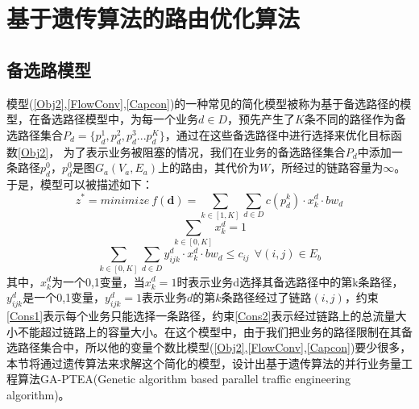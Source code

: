 \section{基于遗传算法的路由优化算法}
\subsection{备选路模型}
模型(\ref{Obj2},\ref{FlowConv},\ref{Capcon})的一种常见的简化模型被称为基于备选路径的模型，在备选路径模型中，为每一个业务$d \in D$，预先产生了$K$条不同的路径作为备选路径集合$P_d=\{p^1_d,p^2_d,p^3_d...p^K_d\}$，通过在这些备选路径中进行选择来优化目标函数\ref{Obj2}，
为了表示业务被阻塞的情况，我们在业务的备选路径集合$P_d$中添加一条路径$p^0_d$，$p_d^0$是图$G_a(V_a,E_a)$上的路由，其代价为$W$，所经过的链路容量为$\infty$。于是，模型可以被描述如下：
\begin{equation}\label{Obj3}
z^* = minimize~f(\mathbf{d})=
\sum\limits_{k \in [1,K]}\sum\limits_{d \in D} c(p_d^k)\cdot x_k^d\cdot bw_d
\end{equation}
\begin{equation}\label{Cons1}
\sum\limits_{k \in [0,K]}x_k^d=1
\end{equation}
\begin{equation}\label{Cons2}
\sum\limits_{k \in [0,K]}\sum\limits_{d \in D} y_{ijk}^d\cdot x_k^d\cdot bw_d\le c_{ij} ~~\forall (i,j)\in E_b
\end{equation}
其中，$x_k^d$为一个0,1变量，当$x_k^d=1$时表示业务d选择其备选路径中的第k条路径，$y_{ijk}^d$是一个0,1变量，$y_{ijk}^d=1$表示业务$d$的第$k$条路径经过了链路$(i,j)$，约束\ref{Cons1}表示每个业务只能选择一条路径，约束\ref{Cons2}表示经过链路上的总流量大小不能超过链路上的容量大小。在这个模型中，由于我们把业务的路径限制在其备选路径集合中，所以他的变量个数比模型(\ref{Obj2},\ref{FlowConv},\ref{Capcon})要少很多，本节将通过遗传算法来求解这个简化的模型，设计出基于遗传算法的并行业务量工程算法GA-PTEA(Genetic algorithm based parallel traffic engineering algorithm)。

